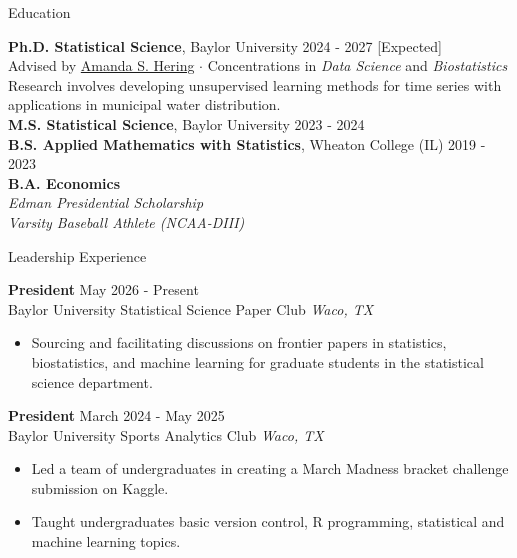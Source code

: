 \documentclass{resume} %
\begin{document}
\newpage


\begin{rSection}{Education}

{\bf Ph.D. Statistical Science}, Baylor University \hfill {2024 - 2027 [Expected]}\\
Advised by \href{https://statistics.artsandsciences.baylor.edu/person/dr-amanda-s-hering}{Amanda S. Hering} $\cdot$ Concentrations in \textit{Data Science} and \textit{Biostatistics} \\
Research involves developing unsupervised learning methods for time series with applications in municipal water distribution.\\
\smallskip
{\bf M.S. Statistical Science}, Baylor University \hfill {2023 - 2024}\\
\smallskip
{\bf B.S. Applied Mathematics with Statistics}, Wheaton College (IL) \hfill {2019 - 2023}\\
{\bf B.A. Economics}\\
\textit{Edman Presidential Scholarship}\\
\textit{Varsity Baseball Athlete (NCAA-DIII)}

\end{rSection}



\begin{rSection}{Leadership Experience}


 \textbf{President} \hfill May 2026 - Present\\
Baylor University Statistical Science Paper Club \hfill \textit{Waco, TX}
 \begin{itemize}
    \itemsep -3pt {}
     \item Sourcing and facilitating discussions on frontier papers in statistics, biostatistics, and machine learning for graduate students in the statistical science department.
 \end{itemize}

\textbf{President} \hfill March 2024 - May 2025\\
Baylor University Sports Analytics Club \hfill \textit{Waco, TX}
 \begin{itemize}
    \itemsep -3pt {}
     \item Led a team of undergraduates in creating a March Madness bracket challenge submission on Kaggle.
     \item Taught undergraduates basic version control, R programming, statistical and machine learning topics.
 \end{itemize}


\end{rSection}
\end{document}
